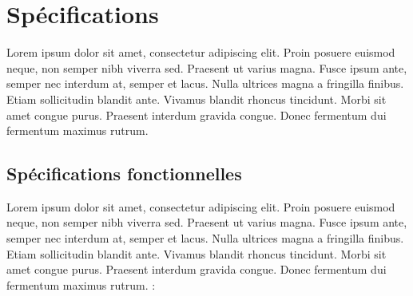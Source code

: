 \clearpage

\section{Spécifications}
Lorem ipsum dolor sit amet, consectetur adipiscing elit. Proin posuere euismod neque, non semper nibh viverra sed. Praesent ut varius magna. Fusce ipsum ante, semper nec interdum at, semper et lacus. Nulla ultrices magna a fringilla finibus. Etiam sollicitudin blandit ante. Vivamus blandit rhoncus tincidunt. Morbi sit amet congue purus. Praesent interdum gravida congue. Donec fermentum dui fermentum maximus rutrum.

\subsection{Spécifications fonctionnelles}
Lorem ipsum dolor sit amet, consectetur adipiscing elit. Proin posuere euismod neque, non semper nibh viverra sed. Praesent ut varius magna. Fusce ipsum ante, semper nec interdum at, semper et lacus. Nulla ultrices magna a fringilla finibus. Etiam sollicitudin blandit ante. Vivamus blandit rhoncus tincidunt. Morbi sit amet congue purus. Praesent interdum gravida congue. Donec fermentum dui fermentum maximus rutrum. :
\renewcommand{\arraystretch}{1.5}
